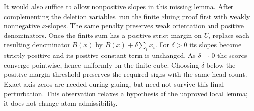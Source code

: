 \documentclass[11pt]{article}
\begin{document}
It would also suffice to allow nonpositive slopes in this missing
lemma. After complementing the deletion variables, run the finite
gluing proof first with weakly nonnegative $x$-slopes. The same
penalty preserves weak orientation and positive denominators.
Once the finite sum has a positive strict margin on $U$, replace
each resulting denominator $B(x)$ by
$B(x)+\delta\sum_i x_i$. For $\delta>0$ its slopes become
strictly positive and its positive constant term is unchanged.
As $\delta\to0$ the scores converge pointwise, hence uniformly
on the finite cube. Choosing $\delta$ below the positive margin
threshold preserves the required signs with the same head count.
Exact axis zeros are needed during gluing, but need not survive
this final perturbation. This observation relaxes a hypothesis of
the unproved local lemma; it does not change atom admissibility.
\end{document}
